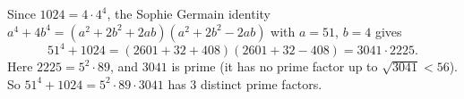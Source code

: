 Since $1024=4\cdot4^4$, the Sophie Germain identity $a^4+4b^4=\left(a^2+2b^2+2ab\right)\left(a^2+2b^2-2ab\right)$ with $a=51$, $b=4$ gives
\[51^4+1024=(2601+32+408)(2601+32-408)=3041\cdot2225.\]
Here $2225=5^2\cdot89$, and $3041$ is prime (it has no prime factor up to $\sqrt{3041}<56$). So $51^4+1024=5^2\cdot89\cdot3041$ has $\boxed{3}$ distinct prime factors.
